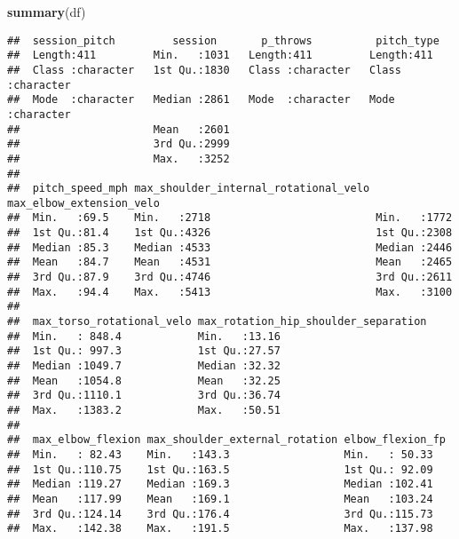 \documentclass[
]{article}
\newenvironment{Shaded}{\begin{snugshade}}{\end{snugshade}}
\newcommand{\FunctionTok}[1]{\textcolor[rgb]{0.13,0.29,0.53}{\textbf{#1}}}
\newcommand{\NormalTok}[1]{#1}
\begin{document}
\begin{Shaded}
\begin{Highlighting}[]
\FunctionTok{summary}\NormalTok{(df)}
\end{Highlighting}
\end{Shaded}

\begin{verbatim}
##  session_pitch         session       p_throws          pitch_type       
##  Length:411         Min.   :1031   Length:411         Length:411        
##  Class :character   1st Qu.:1830   Class :character   Class :character  
##  Mode  :character   Median :2861   Mode  :character   Mode  :character  
##                     Mean   :2601                                        
##                     3rd Qu.:2999                                        
##                     Max.   :3252                                        
##                                                                         
##  pitch_speed_mph max_shoulder_internal_rotational_velo max_elbow_extension_velo
##  Min.   :69.5    Min.   :2718                          Min.   :1772            
##  1st Qu.:81.4    1st Qu.:4326                          1st Qu.:2308            
##  Median :85.3    Median :4533                          Median :2446            
##  Mean   :84.7    Mean   :4531                          Mean   :2465            
##  3rd Qu.:87.9    3rd Qu.:4746                          3rd Qu.:2611            
##  Max.   :94.4    Max.   :5413                          Max.   :3100            
##                                                                                
##  max_torso_rotational_velo max_rotation_hip_shoulder_separation
##  Min.   : 848.4            Min.   :13.16                       
##  1st Qu.: 997.3            1st Qu.:27.57                       
##  Median :1049.7            Median :32.32                       
##  Mean   :1054.8            Mean   :32.25                       
##  3rd Qu.:1110.1            3rd Qu.:36.74                       
##  Max.   :1383.2            Max.   :50.51                       
##                                                                
##  max_elbow_flexion max_shoulder_external_rotation elbow_flexion_fp
##  Min.   : 82.43    Min.   :143.3                  Min.   : 50.33  
##  1st Qu.:110.75    1st Qu.:163.5                  1st Qu.: 92.09  
##  Median :119.27    Median :169.3                  Median :102.41  
##  Mean   :117.99    Mean   :169.1                  Mean   :103.24  
##  3rd Qu.:124.14    3rd Qu.:176.4                  3rd Qu.:115.73  
##  Max.   :142.38    Max.   :191.5                  Max.   :137.98  

\end{verbatim}
\end{document}
